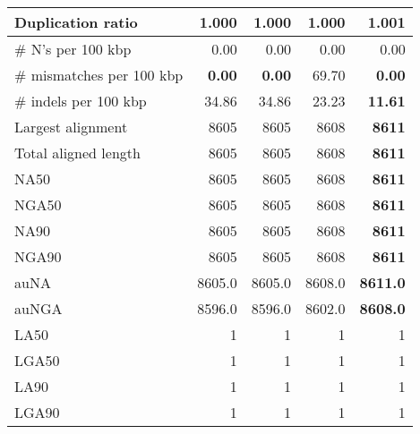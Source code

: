 \documentclass[12pt,a4paper]{article}
\begin{document}
\begin{table}[ht]
\begin{center}
\begin{tabular}{|l*{4}{|r}|}
Duplication ratio & {\bf 1.000} & {\bf 1.000} & {\bf 1.000} & 1.001 \\ \hline
\# N's per 100 kbp & 0.00 & 0.00 & 0.00 & 0.00 \\ \hline
\# mismatches per 100 kbp & {\bf 0.00} & {\bf 0.00} & 69.70 & {\bf 0.00} \\ \hline
\# indels per 100 kbp & 34.86 & 34.86 & 23.23 & {\bf 11.61} \\ \hline
Largest alignment & 8605 & 8605 & 8608 & {\bf 8611} \\ \hline
Total aligned length & 8605 & 8605 & 8608 & {\bf 8611} \\ \hline
NA50 & 8605 & 8605 & 8608 & {\bf 8611} \\ \hline
NGA50 & 8605 & 8605 & 8608 & {\bf 8611} \\ \hline
NA90 & 8605 & 8605 & 8608 & {\bf 8611} \\ \hline
NGA90 & 8605 & 8605 & 8608 & {\bf 8611} \\ \hline
auNA & 8605.0 & 8605.0 & 8608.0 & {\bf 8611.0} \\ \hline
auNGA & 8596.0 & 8596.0 & 8602.0 & {\bf 8608.0} \\ \hline
LA50 & 1 & 1 & 1 & 1 \\ \hline
LGA50 & 1 & 1 & 1 & 1 \\ \hline
LA90 & 1 & 1 & 1 & 1 \\ \hline
LGA90 & 1 & 1 & 1 & 1 \\ \hline
\end{tabular}
\end{center}
\end{table}
\end{document}
